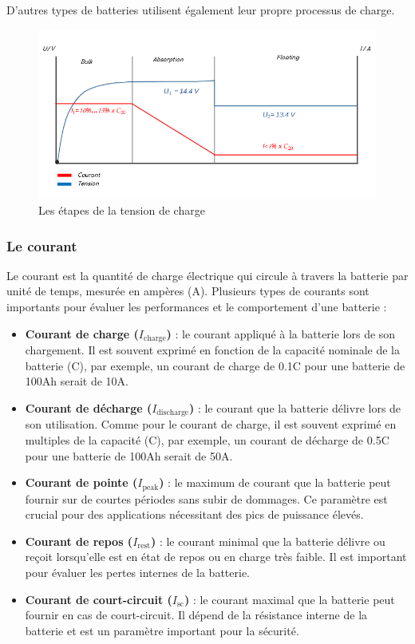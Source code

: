 D'autres types de batteries utilisent également leur propre processus de charge.


\begin{figure}[H]
	\centering
	\includegraphics[width=16cm]{./img/ChargebatHumide.png}
	\caption{Les étapes de la tension de charge }
	\label{i1}
\end{figure}


\subsubsection{Le courant}

Le courant est la quantité de charge électrique qui circule à travers la batterie par unité de temps, mesurée en ampères (A). Plusieurs types de courants sont importants pour évaluer les performances et le comportement d'une batterie :

\begin{itemize}
	\item \textbf{Courant de charge (\(I_{\text{charge}}\))} : le courant appliqué à la batterie lors de son chargement. Il est souvent exprimé en fonction de la capacité nominale de la batterie (C), par exemple, un courant de charge de 0.1C pour une batterie de 100Ah serait de 10A.
	\item \textbf{Courant de décharge (\(I_{\text{discharge}}\))} : le courant que la batterie délivre lors de son utilisation. Comme pour le courant de charge, il est souvent exprimé en multiples de la capacité (C), par exemple, un courant de décharge de 0.5C pour une batterie de 100Ah serait de 50A.
	\item \textbf{Courant de pointe (\(I_{\text{peak}}\))} : le maximum de courant que la batterie peut fournir sur de courtes périodes sans subir de dommages. Ce paramètre est crucial pour des applications nécessitant des pics de puissance élevés.
	\item \textbf{Courant de repos (\(I_{\text{rest}}\))} : le courant minimal que la batterie délivre ou reçoit lorsqu'elle est en état de repos ou en charge très faible. Il est important pour évaluer les pertes internes de la batterie.
	\item \textbf{Courant de court-circuit (\(I_{\text{sc}}\))} : le courant maximal que la batterie peut fournir en cas de court-circuit. Il dépend de la résistance interne de la batterie et est un paramètre important pour la sécurité.
\end{itemize}

